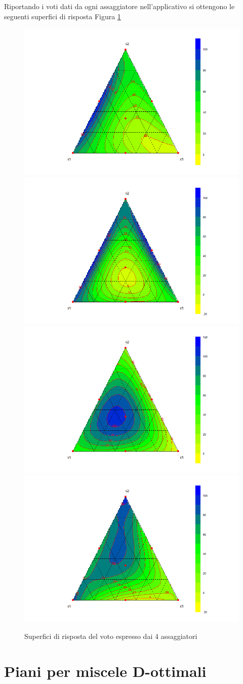 \documentclass[
  11pt,
]{book}
\begin{document}
Riportando i voti dati da ogni assaggiatore nell'applicativo si ottengono le seguenti superfici di risposta Figura \ref{fig:mixfig8}

\begin{figure}[ht]
\includegraphics[width=0.5\linewidth]{Immagini/Mixt/08_aceR} \includegraphics[width=0.5\linewidth]{Immagini/Mixt/09_aceP} \includegraphics[width=0.5\linewidth]{Immagini/Mixt/10_aceM} \includegraphics[width=0.5\linewidth]{Immagini/Mixt/11_aceD} \caption{Superfici di risposta del voto espresso dai 4 assaggiatori}\label{fig:mixfig8}
\end{figure}

\newpage

\hypertarget{piani-per-miscele-d-ottimali}{%
\section{Piani per miscele D-ottimali}\label{piani-per-miscele-d-ottimali}}
\end{document}
